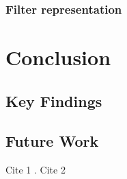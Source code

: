 \documentclass[a4paper,oneside,11pt]{book}
\begin{document}
\subsection{Filter representation}

\chapter{Conclusion}
\section{Key Findings}
\section{Future Work}

Cite 1 \cite{AUT2018}. \vspace{0.25cm}
\noindent Cite 2 \cite{AUT1999}


\end{document}
